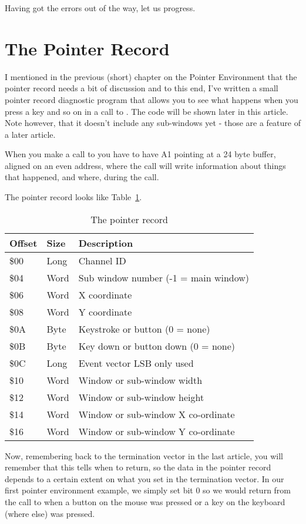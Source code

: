 Having got the errors out of the way, let us progress.

\section{The Pointer Record }
\label{ch21-ptr-record}%

I mentioned in the previous (short) chapter on the Pointer Environment that the pointer
record needs a bit of discussion and to this end, I've written a small pointer record
diagnostic program that allows you to see what happens when you press a key and so on in a
call to . The code will be shown later in this article. Note however, that it
doesn't include any sub-{}windows yet -{} those are a feature of a later article.

When you make a call to  you have to have A1 pointing at a 24 byte buffer, aligned
on an even address, where the call will write information about things that happened, and
where, during the call.

The pointer record looks like Table~\ref{tab:ThePointerRecord}.
\begin{table}[htbp]
\centering
\begin{tabular}{l l p{}}
\toprule
\textbf{Offset} & \textbf{Size} & \textbf{Description} \\
\midrule
%
\$00 & Long & Channel ID \\
\$04 & Word & Sub window number (-1 = main window) \\
\$06 & Word & X coordinate \\
\$08 & Word & Y coordinate \\
\$0A & Byte & Keystroke or button (0 = none) \\
\$0B & Byte & Key down or button down (0 = none) \\
\$0C & Long & Event vector LSB only used \\
\$10 & Word & Window or sub-window width \\
\$12 & Word & Window or sub-window height \\
\$14 & Word & Window or sub-window X co-ordinate \\
\$16 & Word & Window or sub-window Y co-ordinate \\
%
\bottomrule
\end{tabular}
\caption{The pointer record}
\label{tab:ThePointerRecord}
\end{table}

Now, remembering back to the termination vector in the last article, you will remember
that this tells  when to return, so the data in the pointer record depends to a
certain extent on what you set in the termination vector. In our first pointer environment
example, we simply set bit 0 so we would return from the call to  when a button on
the mouse was pressed or a key on the keyboard (where else) was pressed.

